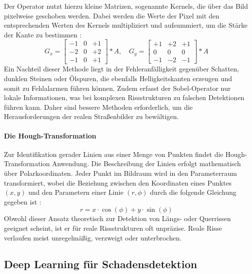 Der Operator nutzt hierzu kleine Matrizen, sogenannte Kernels, die über das Bild pixelweise geschoben werden. Dabei werden die Werte der Pixel mit den entsprechenden Werten des Kernels multipliziert und aufsummiert, um die Stärke der Kante zu bestimmen \cite[Kapitel 3.2]{szeliski2022computer}:
\begin{equation}
    G_x = \begin{bmatrix} -1 & 0 & +1 \\ -2 & 0 & +2 \\ -1 & 0 & +1 \end{bmatrix} * A, \quad G_y = \begin{bmatrix} +1 & +2 & +1 \\ 0 & 0 & 0 \\ -1 & -2 & -1 \end{bmatrix} * A
\end{equation}
Ein Nachteil dieser Methode liegt in der Fehleranfälligkeit gegenüber Schatten, dunklen Steinen oder Ölspuren, die ebenfalls Helligkeitskanten erzeugen und somit zu Fehlalarmen führen können. Zudem erfasst der Sobel-Operator nur lokale Informationen, was bei komplexen Rissstrukturen zu falschen Detektionen führen kann. Daher sind bessere Methoden erforderlich, um die Herausforderungen der realen Straßenbilder zu bewältigen.

\paragraph{Die Hough-Transformation}
Zur Identifikation gerader Linien aus einer Menge von Punkten findet die Hough-Transformation Anwendung. Die Beschreibung der Linien erfolgt mathematisch über Polarkoordinaten. Jeder Punkt im Bildraum wird in den Parameterraum transformiert, wobei die Beziehung zwischen den Koordinaten eines Punktes $(x, y)$ und den Parametern einer Linie $(r, \phi)$ durch die folgende Gleichung gegeben ist \cite[Kapitel 7.4.2]{szeliski2022computer}:
\begin{equation}
    r = x \cdot \cos(\phi) + y \cdot \sin(\phi)
\end{equation}
Obwohl dieser Ansatz theoretisch zur Detektion von Längs- oder Querrissen geeignet scheint, ist er für reale Rissstrukturen oft unpräzise. Reale Risse verlaufen meist unregelmäßig, verzweigt oder unterbrochen.

\subsection{Deep Learning für Schadensdetektion}
\label{subsec:deep_learning}


